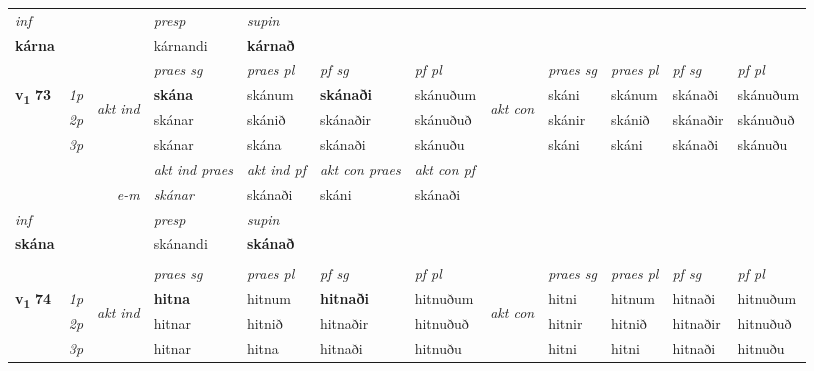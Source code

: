 \begin{longtable}[l]{X>{\footnotesize\itshape}llXXXXlXXXX}
   {\textit{inf}} & &     & \textit{presp} & \textit{supin}   \\*
  {\textbf{kárna}} & &     & kárnandi &  \textbf{kárnað}   \\*

\midrule

 & &   & \textit{praes sg}  & \textit{praes pl}    & \textit{ pf sg} & \textit{pf pl} & & \textit{praes sg}  & \textit{praes pl}    & \textit{pf sg} & \textit{pf pl }  \\ \cmidrule{4-7} \cmidrule{9-12}
 \multirow{2}{*}{{{\textbf{v{\textsubscript{1}}} \Large{\textbf{73}}}}}  & 1p & \multirow{3}{*}{\begin{turn}{90}\textit{akt ind}\end{turn}} & \textbf{skána} & skánum & \textbf{skánaði} & skánuðum & \multirow{3}{*}{\begin{turn}{90}\textit{akt con}\end{turn}} &skáni & skánum & skánaði & skánuðum\\*
 & 2p &  &  skánar  & skánið & skánaðir & skánuðuð & & skánir & skánið & skánaðir & skánuðuð \\*
 & 3p &  & skánar & skána & skánaði & skánuðu & & skáni & skáni& skánaði & skánuðu \\*
\cmidrule{4-7} \cmidrule{9-12}

   && &  \textit{akt ind praes} & \textit{akt ind pf} & \textit{akt con praes} & \textit{akt con pf} \\*
\multicolumn{3}{r}{\textit{e-m}} & skánar & skánaði & skáni & skánaði \\*

\cmidrule{4-7}
   {\textit{inf}} & &     & \textit{presp} & \textit{supin}   \\*
  {\textbf{skána}} & &     & skánandi &  \textbf{skánað}   \\*

\midrule


  & \\
   \midrule
 & &   & \textit{praes sg}  & \textit{praes pl}    & \textit{ pf sg} & \textit{pf pl} & & \textit{praes sg}  & \textit{praes pl}    & \textit{pf sg} & \textit{pf pl }  \\ \cmidrule{4-7} \cmidrule{9-12}
 \multirow{2}{*}{{{\textbf{v{\textsubscript{1}}} \Large{\textbf{74}}}}}  & 1p & \multirow{3}{*}{\begin{turn}{90}\textit{akt ind}\end{turn}} & \textbf{hitna} & hitnum & \textbf{hitnaði} & hitnuðum & \multirow{3}{*}{\begin{turn}{90}\textit{akt con}\end{turn}} &hitni & hitnum & hitnaði & hitnuðum\\*
 & 2p &  &  hitnar  & hitnið & hitnaðir & hitnuðuð & & hitnir & hitnið & hitnaðir & hitnuðuð \\*
 & 3p &  & hitnar & hitna & hitnaði & hitnuðu & & hitni & hitni& hitnaði & hitnuðu \\*
\cmidrule{4-7} \cmidrule{9-12}


\end{longtable}
